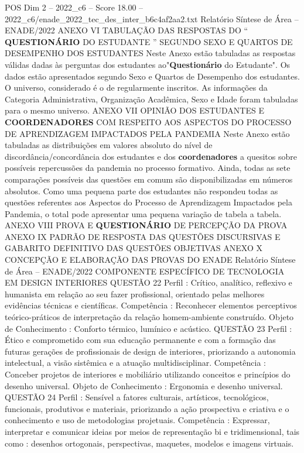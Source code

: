 \begin{textsample}{POS Dim 2 – 2022\_c6 – Score 18.00 – 2022\_c6/enade\_2022\_tec\_des\_inter\_b6c4af2aa2.txt}
Relatório Síntese de Área – ENADE/2022 ANEXO VI TABULAÇÃO DAS RESPOSTAS DO “ \textbf{QUESTIONÁRIO} DO ESTUDANTE ” SEGUNDO SEXO E QUARTOS DE DESEMPENHO DOS ESTUDANTES Neste Anexo estão tabuladas as respostas válidas dadas às perguntas dos estudantes ao"\textbf{Questionário} do Estudante".
Os dados estão apresentados segundo Sexo e Quartos de Desempenho dos estudantes.
O universo, considerado é o de regularmente inscritos.
As informações da Categoria Administrativa, Organização Acadêmica, Sexo e Idade foram tabuladas para o mesmo universo.
ANEXO VII OPINIÃO DOS ESTUDANTES E \textbf{COORDENADORES} COM RESPEITO AOS ASPECTOS DO PROCESSO DE APRENDIZAGEM IMPACTADOS PELA PANDEMIA Neste Anexo estão tabuladas as distribuições em valores absoluto do nível de discordância/concordância dos estudantes e dos \textbf{coordenadores} a quesitos sobre possíveis repercussões da pandemia no processo formativo.
Ainda, todas as sete comparações possíveis das questões em comum são disponibilizadas em números absolutos.
Como uma pequena parte dos estudantes não respondeu todas as questões referentes aos Aspectos do Processo de Aprendizagem Impactados pela Pandemia, o total pode apresentar uma pequena variação de tabela a tabela.
ANEXO VIII PROVA E \textbf{QUESTIONÁRIO} DE PERCEPÇÃO DA PROVA ANEXO IX PADRÃO DE RESPOSTA DAS QUESTÕES DISCURSIVAS E GABARITO DEFINITIVO DAS QUESTÕES OBJETIVAS ANEXO X CONCEPÇÃO E ELABORAÇÃO DAS PROVAS DO ENADE Relatório Síntese de Área – ENADE/2022 COMPONENTE ESPECÍFICO DE TECNOLOGIA EM DESIGN INTERIORES QUESTÃO 22 Perfil : Crítico, analítico, reflexivo e humanista em relação ao seu fazer profissional, orientado pelas melhores evidências técnicas e científicas.
Competência : Reconhecer elementos perceptivos teórico-práticos de interpretação da relação homem-ambiente construído.
Objeto de Conhecimento : Conforto térmico, lumínico e acústico.
QUESTÃO 23 Perfil : Ético e comprometido com sua educação permanente e com a formação das futuras gerações de profissionais de design de interiores, priorizando a autonomia intelectual, a visão sistêmica e a atuação multidisciplinar.
Competência : Conceber projetos de interiores e mobiliário utilizando conceitos e princípios do desenho universal.
Objeto de Conhecimento : Ergonomia e desenho universal.
QUESTÃO 24 Perfil : Sensível a fatores culturais, artísticos, tecnológicos, funcionais, produtivos e materiais, priorizando a ação prospectiva e criativa e o conhecimento e uso de metodologias projetuais.
Competência : Expressar, interpretar e comunicar ideias por meios de representação bi e tridimensional, tais como : desenhos ortogonais, perspectivas, maquetes, modelos e imagens virtuais.

\end{textsample}
